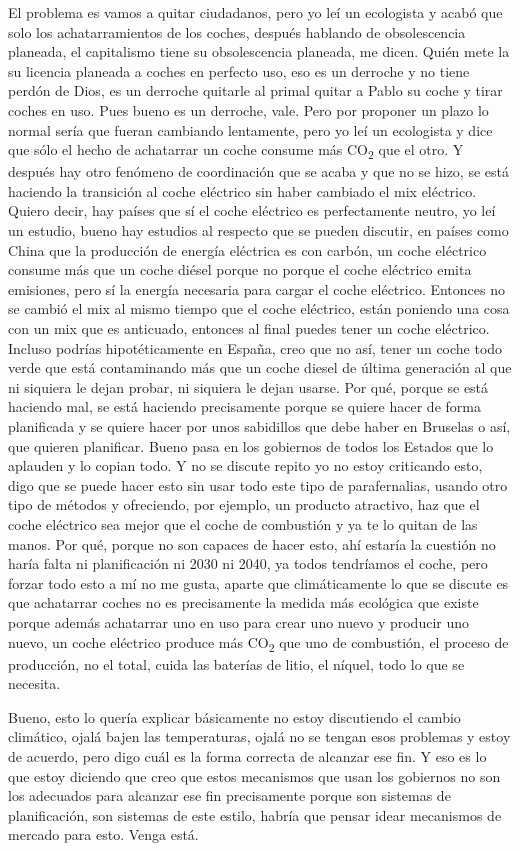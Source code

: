 El problema es vamos a quitar ciudadanos, pero yo leí un ecologista y acabó que solo los achatarramientos de los coches, después hablando de obsolescencia planeada, el capitalismo tiene su obsolescencia planeada, me dicen. Quién mete la su licencia planeada a coches en perfecto uso, eso es un derroche y no tiene perdón de Dios, es un derroche quitarle al primal quitar a Pablo su coche y tirar coches en uso. Pues bueno es un derroche, vale. Pero por proponer un plazo lo normal sería que fueran cambiando lentamente, pero yo leí un ecologista y dice que sólo el hecho de achatarrar un coche consume más CO\textsubscript{2} que el otro. Y después hay otro fenómeno de coordinación que se acaba y que no se hizo, se está haciendo la transición al coche eléctrico sin haber cambiado el mix eléctrico. Quiero decir, hay países que sí el coche eléctrico es perfectamente neutro, yo leí un estudio, bueno hay estudios al respecto que se pueden discutir, en países como China que la producción de energía eléctrica es con carbón, un coche eléctrico consume más que un coche diésel porque no porque el coche eléctrico emita emisiones, pero sí la energía necesaria para cargar el coche eléctrico. Entonces no se cambió el mix al mismo tiempo que el coche eléctrico, están poniendo una cosa con un mix que es anticuado, entonces al final puedes tener un coche eléctrico. Incluso  podrías hipotéticamente en España, creo que no así, tener un coche todo verde que está contaminando más que un coche diesel de última generación al que ni siquiera le dejan probar, ni siquiera le dejan usarse. Por qué, porque se está haciendo mal, se está haciendo precisamente porque se quiere hacer de forma planificada y se quiere hacer por unos sabidillos que debe haber en Bruselas o así, que quieren planificar. Bueno pasa en los gobiernos de todos los Estados que lo aplauden y lo copian todo. Y no se discute repito yo no estoy criticando esto, digo que se puede hacer esto sin usar todo este tipo de parafernalias, usando otro tipo de métodos y ofreciendo, por ejemplo, un producto atractivo, haz que el coche eléctrico sea mejor que el coche de combustión y ya te lo quitan de las manos. Por qué, porque no son capaces de hacer esto, ahí estaría la cuestión no haría falta ni planificación ni 2030 ni 2040, ya todos tendríamos el coche, pero forzar todo esto a mí no me gusta, aparte que climáticamente lo que se discute es que achatarrar coches no es precisamente la medida más ecológica que existe porque además achatarrar uno en uso para crear uno nuevo y producir uno nuevo, un coche eléctrico produce más CO\textsubscript{2} que uno de combustión, el proceso de producción, no el total, cuida las baterías de litio, el níquel, todo lo que se necesita.

Bueno, esto lo quería explicar básicamente no estoy discutiendo el cambio climático, ojalá bajen las temperaturas, ojalá no se tengan esos problemas y estoy de acuerdo, pero digo cuál es la forma correcta de alcanzar ese fin. Y eso es lo que estoy diciendo que creo que estos mecanismos que usan los gobiernos no son los adecuados para alcanzar ese fin precisamente porque son sistemas de planificación, son sistemas de este estilo, habría que pensar idear mecanismos de mercado para esto. Venga está.
